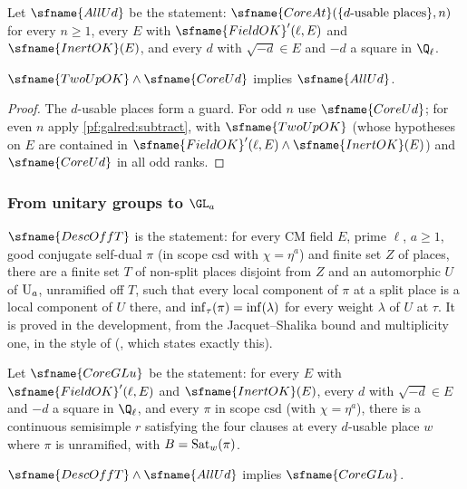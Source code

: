 Let $\sfname{AllUd}$ be the statement: $\sfname{CoreAt}(\{d\text{-usable places}\},n)$ for every $n\ge1$, every $E$ with
$\sfname{FieldOK}'(\ell,E)$ and $\sfname{InertOK}(E)$, and every $d$ with $\sqrt{-d}\in E$ and $-d$ a square in $\Q_\ell$.

\begin{theorem}\label{pf:galred:joinAll}
$\sfname{TwoUpOK}\wedge\sfname{CoreUd}$ implies $\sfname{AllUd}$.
\end{theorem}

\begin{proof}
The $d$-usable places form a guard. For odd $n$ use $\sfname{CoreUd}$; for even $n$ apply \cref{pf:galred:subtract}, with
$\sfname{TwoUpOK}$ (whose hypotheses on $E$ are contained in $\sfname{FieldOK}'(\ell,E)\wedge\sfname{InertOK}(E)$) and
$\sfname{CoreUd}$ in all odd ranks.
\end{proof}

\subsubsection{From unitary groups to \texorpdfstring{$\GL_a$}{GL(a)}}

$\sfname{DescOffT}$ is the statement: for every CM field $E$, prime $\ell$, $a\ge1$, good conjugate self-dual $\pi$ (in scope
$\mathrm{csd}$ with $\chi=\eta^a$) and finite set $Z$ of places, there are a finite set $T$ of non-split places disjoint from
$Z$ and an automorphic $U$ of $\mathrm{U}_a$, unramified off $T$, such that every local component of $\pi$ at a split place is a
local component of $U$ there, and $\operatorname{inf}_\tau(\pi)=\operatorname{inf}(\lambda)$ for every weight $\lambda$ of $U$ at $\tau$. It is
proved in the development, from the Jacquet--Shalika bound and multiplicity one, in the style of
\cite{Labesse2011,ClozelHarrisLabesse2011} (, which states exactly this).

Let $\sfname{CoreGLu}$ be the statement: for every $E$ with $\sfname{FieldOK}'(\ell,E)$ and $\sfname{InertOK}(E)$, every $d$ with
$\sqrt{-d}\in E$ and $-d$ a square in $\Q_\ell$, and every $\pi$ in scope $\mathrm{csd}$ (with $\chi=\eta^a$), there is a continuous
semisimple $r$ satisfying the four clauses at every $d$-usable place $w$ where $\pi$ is unramified, with
$B=\operatorname{Sat}_w(\pi)$.

\begin{theorem}\label{pf:galred:joinGL}
$\sfname{DescOffT}\wedge\sfname{AllUd}$ implies $\sfname{CoreGLu}$.
\end{theorem}

